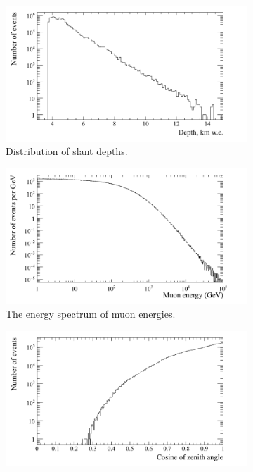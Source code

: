 \begin{figure}[h!]
  \centering
  \begin{subfigure}{0.45\textwidth}
    \centering
    \includegraphics[width=\textwidth]{DepthCan}
    \caption{Distribution of slant depths.}
  \end{subfigure}
  \hspace{0.08\textwidth}
  \begin{subfigure}{0.45\textwidth}
    \centering
    \includegraphics[width=\textwidth]{EnergyPerGeVCan}
    \caption{The energy spectrum of muon energies.}
  \end{subfigure}
  \begin{subfigure}{0.45\textwidth}
    \centering
    \includegraphics[width=\textwidth]{ZenithCan}

\end{subfigure}
\end{figure}
